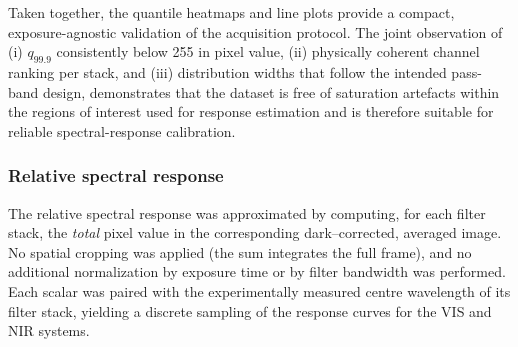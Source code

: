 \noindent Taken together, the quantile heatmaps and line plots provide a compact, exposure-agnostic validation of the acquisition protocol. The joint observation of (i) $q_{99.9}$ consistently below 255 in pixel value, (ii) physically coherent channel ranking per stack, and (iii) distribution widths that follow the intended pass-band design, demonstrates that the dataset is free of saturation artefacts within the regions of interest used for response estimation and is therefore suitable for reliable spectral-response calibration.\\




\subsubsection*{Relative spectral response}
\label{subsub:relative_spectral_response}

\noindent
The relative spectral response was approximated by computing, for each filter stack, the \emph{total} pixel value in the corresponding dark–corrected, averaged image. No spatial cropping was applied (the sum integrates the full frame), and no additional normalization by exposure time or by filter bandwidth was performed. Each scalar was paired with the experimentally measured centre wavelength of its filter stack, yielding a discrete sampling of the response curves for the VIS and NIR systems.\\

